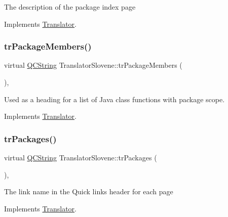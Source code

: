 The description of the package index page 

Implements \mbox{\hyperlink{class_translator}{Translator}}.

\mbox{\label{class_translator_slovene_a7254297c88f81c88303fb9976bd88f87}} 
\subsubsection{\texorpdfstring{trPackageMembers()}{trPackageMembers()}}
{\footnotesize\ttfamily virtual \mbox{\hyperlink{class_q_c_string}{Q\+C\+String}} Translator\+Slovene\+::tr\+Package\+Members (\begin{DoxyParamCaption}{ }\end{DoxyParamCaption})\hspace{0.3cm}{\ttfamily [inline]}, {\ttfamily [virtual]}}

Used as a heading for a list of Java class functions with package scope. 

Implements \mbox{\hyperlink{class_translator}{Translator}}.

\mbox{\label{class_translator_slovene_af7fbcf11da09dddbff688ecfc196a927}} 
\subsubsection{\texorpdfstring{trPackages()}{trPackages()}}
{\footnotesize\ttfamily virtual \mbox{\hyperlink{class_q_c_string}{Q\+C\+String}} Translator\+Slovene\+::tr\+Packages (\begin{DoxyParamCaption}{ }\end{DoxyParamCaption})\hspace{0.3cm}{\ttfamily [inline]}, {\ttfamily [virtual]}}

The link name in the Quick links header for each page 

Implements \mbox{\hyperlink{class_translator}{Translator}}.

\mbox{\label{class_translator_slovene_a5ed55e47bc0f2c335f63ece6267301b0}} 

